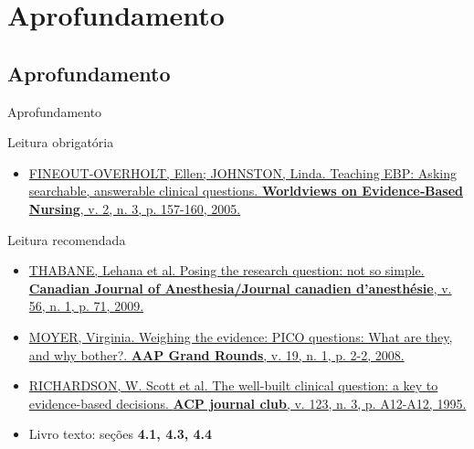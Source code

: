 \documentclass{beamer}
\begin{document}
\section{Aprofundamento}

\subsection{Aprofundamento}

\begin{frame}{Aprofundamento}
  \begin{block}{Leitura obrigatória}
    \begin{itemize}
      \scriptsize
    \item \href{https://doi.org/10.1111/j.1741-6787.2005.00032.x}
      {FINEOUT‐OVERHOLT, Ellen; JOHNSTON, Linda. Teaching EBP: Asking
        searchable, answerable clinical questions. {\bf Worldviews on
          Evidence‐Based Nursing}, v. 2, n. 3, p. 157-160, 2005.}
    \end{itemize}
  \end{block}
  \begin{block}{Leitura recomendada}
    \begin{itemize}
      \tiny
    \item \href{https://doi.org/10.1007/s12630-008-9007-4}
      {THABANE, Lehana et al. Posing the research question: not so
        simple. {\bf Canadian Journal of Anesthesia/Journal canadien
          d'anesthésie}, v. 56, n. 1, p. 71, 2009.}
    \item \href{https://doi.org/10.1542/gr.19-1-2}
      {MOYER, Virginia. Weighing the evidence: PICO questions: What
        are they, and why bother?. {\bf AAP Grand Rounds}, v. 19,
        n. 1, p. 2-2, 2008.}
    \item
      \href{https://acpjc.acponline.org/Content/123/3/issue/ACPJC-1995-123-3-A12.htm}
      {RICHARDSON, W. Scott et al. The well-built clinical question: a
        key to evidence-based decisions. {\bf ACP journal club},
        v. 123, n. 3, p. A12-A12, 1995.}
      \scriptsize
    \item Livro texto: seções {\bf 4.1, 4.3, 4.4}
    \end{itemize}
  \end{block}
\end{frame}
\end{document}
